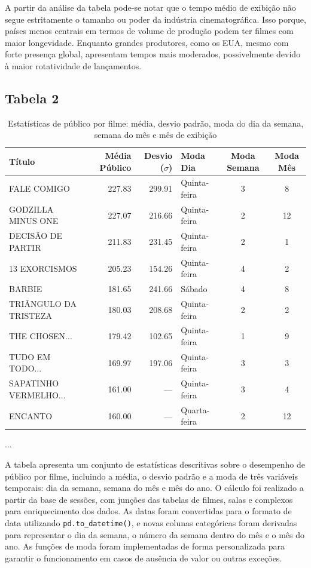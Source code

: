 \documentclass{article}
\begin{document}
 
A partir da análise da tabela pode-se notar que o tempo médio de exibição não segue estritamente o tamanho ou poder da indústria cinematográfica.
Isso porque, países menos centrais em termos de volume de produção podem ter filmes com maior longevidade. Enquanto grandes produtores,
como os EUA, mesmo com forte presença global, apresentam tempos mais moderados, possivelmente devido à maior rotatividade de lançamentos.

\pagebreak
\subsection*{Tabela 2}

\begin{table}[H]
\centering
\caption{Estatísticas de público por filme: média, desvio padrão, moda do dia da semana, semana do mês e mês de exibição\\}
\begin{small}
\begin{tabularx}{\textwidth}{X r r l c c}
\hline
\textbf{Título} & \textbf{Média Público} & \textbf{Desvio ($\sigma$)} & \textbf{Moda Dia} & \textbf{Moda Semana} & \textbf{Moda Mês} \\
\hline
FALE COMIGO & 227.83 & 299.91 & Quinta-feira & 3 & 8 \\
GODZILLA MINUS ONE & 227.07 & 216.66 & Quinta-feira & 2 & 12 \\
DECISÃO DE PARTIR & 211.83 & 231.45 & Quinta-feira & 2 & 1 \\
13 EXORCISMOS & 205.23 & 154.26 & Quinta-feira & 4 & 2 \\
BARBIE & 181.65 & 241.66 & Sábado & 4 & 8 \\
TRIÂNGULO DA TRISTEZA & 180.03 & 208.68 & Quinta-feira & 2 & 2 \\
THE CHOSEN... & 179.42 & 102.65 & Quinta-feira & 1 & 9 \\
TUDO EM TODO... & 169.97 & 197.06 & Quinta-feira & 3 & 3 \\
SAPATINHO VERMELHO... & 161.00 & --- & Quinta-feira & 3 & 4 \\
ENCANTO & 160.00 & --- & Quarta-feira & 2 & 12 \\

\end{tabularx}
\end{small}
\begin{center}
$\ldots$
\end{center}
\end{table}
A tabela apresenta um conjunto de estatísticas descritivas sobre o desempenho de público por filme, incluindo a média, o desvio padrão e a moda de três variáveis temporais: dia da semana, semana do mês e mês do ano. O cálculo foi realizado a partir da base de sessões, com junções das tabelas de filmes, salas e complexos para enriquecimento dos dados. As datas foram convertidas para o formato de data utilizando \texttt{pd.to\_datetime()}, e novas colunas categóricas foram derivadas para representar o dia da semana, o número da semana dentro do mês e o mês do ano. As funções de moda foram implementadas de forma personalizada para garantir o funcionamento em casos de ausência de valor ou outras exceções.
\end{document}
